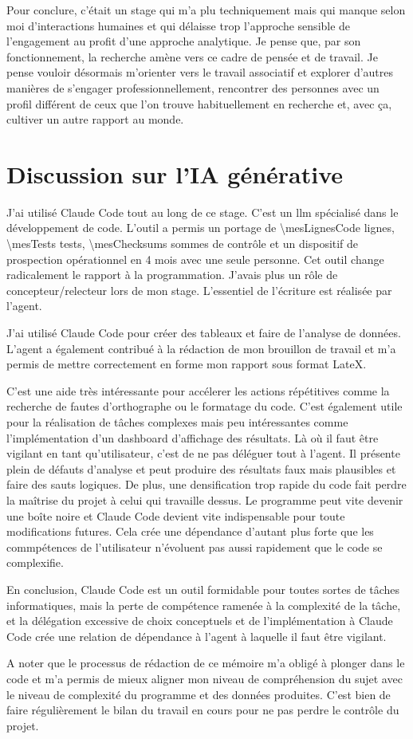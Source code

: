 Pour conclure, c'était un stage qui m'a plu techniquement mais qui manque selon moi d'interactions 
humaines et qui délaisse trop l'approche sensible de l'engagement au profit d'une approche 
analytique. Je pense que, par son fonctionnement, la recherche amène vers ce cadre de pensée et 
de travail. Je pense vouloir désormais m'orienter vers le travail associatif et explorer 
d'autres manières de s'engager professionnellement, rencontrer des personnes avec un profil 
différent de ceux que l'on trouve habituellement en recherche et, avec ça, cultiver un autre 
rapport au monde.

\section{Discussion sur l'IA générative}
\label{sec:disc-ia}

J'ai utilisé Claude Code tout au long de ce stage. C'est un \gls{llm} spécialisé dans le
développement de code. L'outil a permis un portage de \num{\mesLignesCode} lignes,
\num{\mesTests} tests, \num{\mesChecksums} sommes de contrôle et un dispositif de prospection
opérationnel en 4 mois avec une seule personne. Cet outil change radicalement le rapport à la programmation. J'avais plus un rôle de 
concepteur/relecteur lors de mon stage. L'essentiel de l'écriture est réalisée par l'agent.

J'ai utilisé Claude Code pour créer des tableaux et faire de l'analyse de données. L'agent a 
également contribué à la rédaction de mon brouillon de travail et m'a permis de mettre 
correctement en forme mon rapport sous format LateX.

C'est une aide très intéressante pour accélerer les actions répétitives comme la recherche 
de fautes d'orthographe ou le formatage du code. C'est également utile pour la réalisation de 
tâches complexes mais peu intéressantes comme l'implémentation d'un dashboard d'affichage 
des résultats. Là où il faut être vigilant en tant qu'utilisateur, c'est de ne pas déléguer tout à l'agent.
Il présente plein de défauts d'analyse et peut produire des résultats faux mais plausibles et faire des 
sauts logiques. De plus, une densification trop rapide du code fait perdre la maîtrise du projet à celui qui travaille dessus.
Le programme peut vite devenir une boîte noire et Claude Code devient vite indispensable pour toute modifications futures.
Cela crée une dépendance d'autant plus forte que les commpétences de l'utilisateur n'évoluent pas aussi 
rapidement que le code se complexifie. 

En conclusion, Claude Code est un outil formidable pour toutes sortes de tâches informatiques, 
mais la perte de compétence ramenée à la complexité de la tâche, et la délégation excessive de 
choix conceptuels et de l'implémentation à Claude Code crée une relation de dépendance à l'agent 
à laquelle il faut être vigilant. 

A noter que le processus de rédaction de ce mémoire m'a obligé à plonger dans le code et m'a 
permis de mieux aligner mon niveau de compréhension du sujet avec le niveau de complexité du 
programme et des données produites. C'est bien de faire régulièrement le bilan du travail 
en cours pour ne pas perdre le contrôle du projet.

